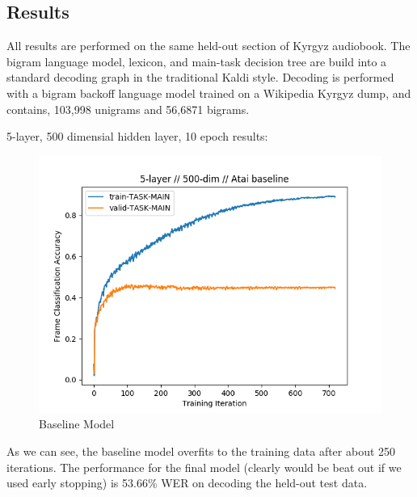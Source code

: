 \documentclass[a4paper]{article}
\begin{document}
\subsection{Results}


All results are performed on the same held-out section of Kyrgyz audiobook. The bigram language model, lexicon, and main-task decision tree are build into a standard decoding graph in the traditional Kaldi style. Decoding is performed with a bigram backoff language model trained on a Wikipedia Kyrgyz dump, and contains, 103,998 unigrams and 56,6871 bigrams.

5-layer, 500 dimensial hidden layer, 10 epoch results:


\begin{figure}[!htb]
  \centering
{}
  \includegraphics[width=\linewidth]{figs/atai-baseline.png}
  \caption{Baseline Model}
\endminipage\hfill
\end{figure}

As we can see, the baseline model overfits to the training data after about 250 iterations. The performance for the final model (clearly would be beat out if we used early stopping) is 53.66\% WER on decoding the held-out test data.
\end{document}
